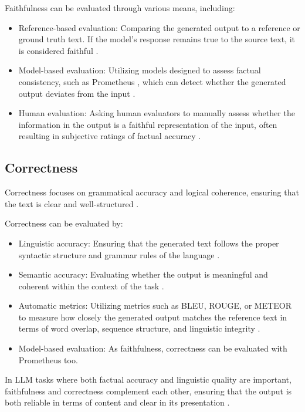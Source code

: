 Faithfulness can be evaluated through various means, including: \begin{itemize} \item Reference-based evaluation: Comparing the generated output to a reference or ground truth text. If the model's response remains true to the source text, it is considered faithful \cite{parcalabescu2024measuringfaithfulnessselfconsistencynatural}. \item Model-based evaluation: Utilizing models designed to assess factual consistency, such as Prometheus \cite{kim2024prometheus2opensource}, which can detect whether the generated output deviates from the input \cite{gat2023faithfulexplanationsblackboxnlp}. \item Human evaluation: Asking human evaluators to manually assess whether the information in the output is a faithful representation of the input, often resulting in subjective ratings of factual accuracy \cite{jacovi-goldberg-2020-towards}. \end{itemize}

\subsection{Correctness}
Correctness focuses on grammatical accuracy and logical coherence, ensuring that the text is clear and well-structured \cite{varshney-etal-2022-towards}.

Correctness can be evaluated by: \begin{itemize} \item Linguistic accuracy: Ensuring that the generated text follows the proper syntactic structure and grammar rules of the language \cite{varshney-etal-2022-towards}. \item Semantic accuracy: Evaluating whether the output is meaningful and coherent within the context of the task \cite{steen2023littlepushnlimodels}. \item Automatic metrics: Utilizing metrics such as BLEU, ROUGE, or METEOR to measure how closely the generated output matches the reference text in terms of word overlap, sequence structure, and linguistic integrity \cite{gat2023faithfulexplanationsblackboxnlp}. \item Model-based evaluation: As faithfulness, correctness can be evaluated with Prometheus too\cite{kim2024prometheus2opensource}.\end{itemize}

In LLM tasks where both factual accuracy and linguistic quality are important, faithfulness and correctness complement each other, ensuring that the output is both reliable in terms of content and clear in its presentation \cite{jacovi-goldberg-2020-towards}.

